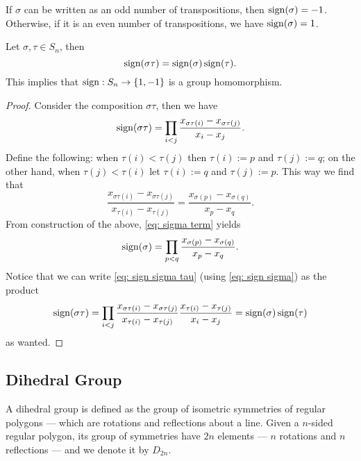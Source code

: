 \begin{corollary}
  If \(\sigma\) can be written as an odd number of transpositions, then
  \(\operatorname{sign}(\sigma) = -1\). Otherwise, if it is an even number of
  transpositions, we have \(\operatorname{sign}(\sigma) = 1\).
\end{corollary}

\begin{proposition}\label{prop: sign is a group homomorphism}
  Let \(\sigma, \tau \in S_n\), then
  \[
    \operatorname{sign}(\sigma \tau) = \operatorname{sign}(\sigma)
    \operatorname{sign}(\tau).
  \]
  This implies that \(\operatorname{sign}: S_n \to \{1, -1\}\) is a
  group homomorphism.
\end{proposition}

\begin{proof}
  Consider the composition \(\sigma \tau\), then we have
  \begin{equation}\label{eq: sign sigma tau}
     \operatorname{sign}(\sigma \tau) = \prod_{i < j} \frac{x_{\sigma\tau(i)} -
     x_{\sigma\tau(j)}}{x_i - x_j}.
  \end{equation}
  Define the following: when \(\tau(i) < \tau(j)\) then \(\tau(i) := p\) and
  \(\tau(j) := q\); on the other hand, when \(\tau(j) < \tau(i)\) let \(\tau(i)
  := q\) and \(\tau(j) := p\). This way we find that
  \begin{equation}\label{eq: sigma term}
    \frac{x_{\sigma\tau(i)} - x_{\sigma\tau(j)}}{x_{\tau(i)} - x_{\tau(j)}}
    = \frac{x_{\sigma(p)} - x_{\sigma(q)}}{x_p - x_q}.
  \end{equation}
  From construction of the above, \cref{eq: sigma term} yields
  \begin{equation}\label{eq: sign sigma}
    \operatorname{sign}(\sigma) = \prod_{p < q} \frac{x_{\sigma(p)} -
    x_{\sigma(q)}}{x_p - x_q}.
  \end{equation}
  Notice that we can write \cref{eq: sign sigma tau} (using \cref{eq: sign
  sigma}) as the product
  \[
    \operatorname{sign}(\sigma \tau) = \prod_{i < j}
    \frac{x_{\sigma \tau(i)} - x_{\sigma \tau(j)}}{x_{\tau(i)} - x_{\tau(j)}}
    \frac{x_{\tau(i)} - x_{\tau(j)}}{x_i - x_j}
    = \operatorname{sign}(\sigma) \operatorname{sign}(\tau)
  \]
  as wanted.
\end{proof}

\subsection{Dihedral Group}

\begin{definition}\label{def: dihedral}
  A dihedral group is defined as the group of isometric symmetries of regular
  polygons --- which are rotations and reflections about a line. Given a
  \(n\)-sided regular polygon, its group of symmetries have \(2n\) elements ---
  \(n\) rotations and \(n\) reflections --- and we denote it by \(D_{2n}\).
\end{definition}

